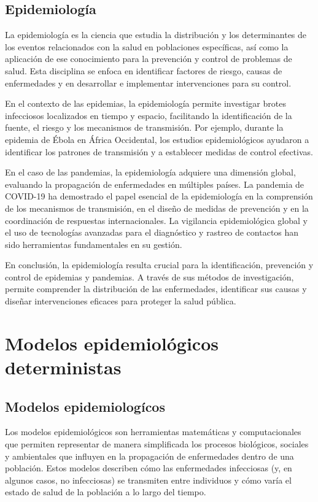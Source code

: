 \subsection{Epidemiología}
La epidemiología es la ciencia que estudia la distribución y los determinantes de los eventos relacionados con la salud en poblaciones específicas, así como la aplicación de ese conocimiento para la prevención y control de problemas de salud. Esta disciplina se enfoca en identificar factores de riesgo, causas de enfermedades y en desarrollar e implementar intervenciones para su control.

En el contexto de las epidemias, la epidemiología permite investigar brotes infecciosos localizados en tiempo y espacio, facilitando la identificación de la fuente, el riesgo y los mecanismos de transmisión. Por ejemplo, durante la epidemia de Ébola en África Occidental, los estudios epidemiológicos ayudaron a identificar los patrones de transmisión y a establecer medidas de control efectivas.

En el caso de las pandemias, la epidemiología adquiere una dimensión global, evaluando la propagación de enfermedades en múltiples países. La pandemia de COVID-19 ha demostrado el papel esencial de la epidemiología en la comprensión de los mecanismos de transmisión, en el diseño de medidas de prevención y en la coordinación de respuestas internacionales. La vigilancia epidemiológica global y el uso de tecnologías avanzadas para el diagnóstico y rastreo de contactos han sido herramientas fundamentales en su gestión.

En conclusión, la epidemiología resulta crucial para la identificación, prevención y control de epidemias y pandemias. A través de sus métodos de investigación, permite comprender la distribución de las enfermedades, identificar sus causas y diseñar intervenciones eficaces para proteger la salud pública.



\section{Modelos epidemiológicos  deterministas}
\subsection{Modelos epidemiologícos}
Los modelos epidemiológicos son herramientas matemáticas y computacionales que permiten representar de manera simplificada los procesos biológicos, sociales y ambientales que influyen en la propagación de enfermedades dentro de una población. Estos modelos describen cómo las enfermedades infecciosas (y, en algunos casos, no infecciosas) se transmiten entre individuos y cómo varía el estado de salud de la población a lo largo del tiempo.


